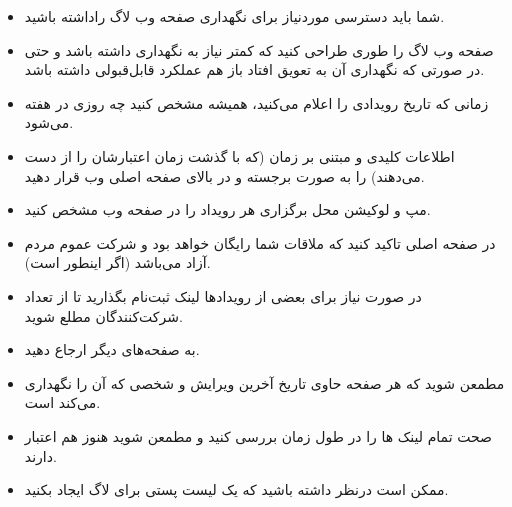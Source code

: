 \begin{itemize}
\item
شما باید دسترسی موردنیاز برای نگهداری صفحه وب لاگ راداشته باشید.
\item
صفحه وب لاگ را طوری طراحی کنید که کمتر نیاز به نگهداری داشته باشد و حتی در صورتی که
نگهداری آن به تعویق افتاد باز هم عملکرد قابل‌قبولی داشته باشد.
\item
زمانی که تاریخ رویدادی را اعلام می‌کنید، همیشه مشخص کنید چه روزی در هفته می‌شود.
\item
اطلاعات کلیدی و مبتنی بر زمان (که با گذشت زمان اعتبارشان را از دست می‌دهند)
را به صورت برجسته و در بالای صفحه اصلی وب قرار دهید.
\item
مپ و لوکیشن محل برگزاری هر رویداد را در صفحه وب مشخص کنید.
\item
در صفحه اصلی تاکید کنید که ملاقات شما رایگان خواهد بود و شرکت عموم مردم آزاد می‌باشد
(اگر اینطور است).
\item
در صورت نیاز برای بعضی از رویدادها لینک ثبت‌نام بگذارید تا از تعداد شرکت‌کنندگان مطلع شوید.
\item
به صفحه‌های دیگر ارجاع دهید.
\item
مطمعن شوید که هر صفحه حاوی تاریخ آخرین ویرایش و شخصی که آن را نگهداری می‌کند است.
\item
صحت تمام لینک ها را در طول زمان بررسی کنید و مطمعن شوید هنوز هم اعتبار دارند.
\item
ممکن است درنظر داشته باشید که یک لیست پستی برای لاگ ایجاد بکنید.

\end{itemize}
